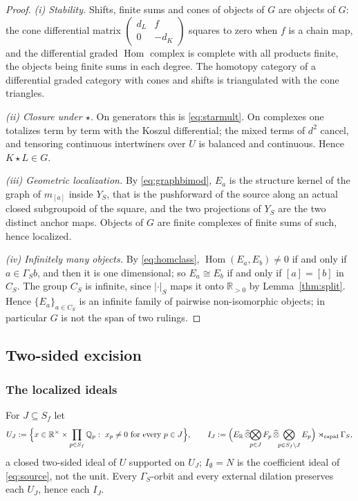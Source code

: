 \documentclass[11pt]{amsart}
\theoremstyle{definition}
\theoremstyle{remark}
\newcommand{\R}{\mathbb R}
\newcommand{\Q}{\mathbb Q}
\newcommand{\Hom}{\operatorname{Hom}}
\begin{document}
\begin{proof}
\emph{(i) Stability.}  Shifts, finite sums and cones of objects of $G$ are
objects of $G$: the cone differential matrix
$\left(\begin{smallmatrix}d_L&f\\0&-d_K\end{smallmatrix}\right)$ squares to
zero when $f$ is a chain map, and the differential graded $\Hom$ complex is
complete with all products finite, the objects being finite sums in each
degree.  The homotopy category of a differential graded category with cones
and shifts is triangulated with the cone triangles.

\emph{(ii) Closure under $\star$.}  On generators this is \eqref{eq:starmult}.
On complexes one totalizes term by term with the Koszul differential; the mixed
terms of $d^{2}$ cancel, and tensoring continuous intertwiners over $U$ is
balanced and continuous.  Hence $K\star L\in G$.

\emph{(iii) Geometric localization.}  By \eqref{eq:graphbimod}, $E_a$ is the
structure kernel of the graph of $m_{[a]}$ inside $Y_S$, that is the
pushforward of the source along an actual closed subgroupoid of the square,
and the two projections of $Y_S$ are the two distinct anchor maps.  Objects of
$G$ are finite complexes of finite sums of such, hence localized.

\emph{(iv) Infinitely many objects.}  By \eqref{eq:homclass},
$\Hom(E_a,E_b)\ne0$ if and only if $a\in\Gamma_S b$, and then it is one
dimensional; so $E_a\cong E_b$ if and only if $[a]=[b]$ in $C_S$.  The group
$C_S$ is infinite, since $|\cdot|_S$ maps it onto $\R_{>0}$ by
Lemma~\ref{thm:split}.  Hence $\{E_a\}_{a\in C_S}$ is an infinite family of
pairwise non-isomorphic objects; in particular $G$ is not the span of two
rulings.
\end{proof}

\subsection{Two-sided excision}

\subsubsection*{The localized ideals}

For $J\subseteq S_f$ let
\begin{equation}\label{eq:UJ}
U_J:=\Bigl\{x\in\R^{\times}\times\prod_{p\in S_f}\Q_p:\ x_p\ne0\ \text{for every }p\in J\Bigr\},\qquad
I_J:=\Bigl(E_{\R}\,\widehat\otimes\!\!\bigotimes_{p\in J}F_p\,\widehat\otimes\!
\!\bigotimes_{p\in S_f\setminus J}E_p\Bigr)\rtimes_{\mathrm{rapid}}\Gamma_S ,
\end{equation}
a closed two-sided ideal of $U$ supported on $U_J$; $I_{\emptyset}=N$ is the
coefficient ideal of \eqref{eq:source}, not the unit.  Every $\Gamma_S$-orbit
and every external dilation preserves each $U_J$, hence each $I_J$.
\end{document}
